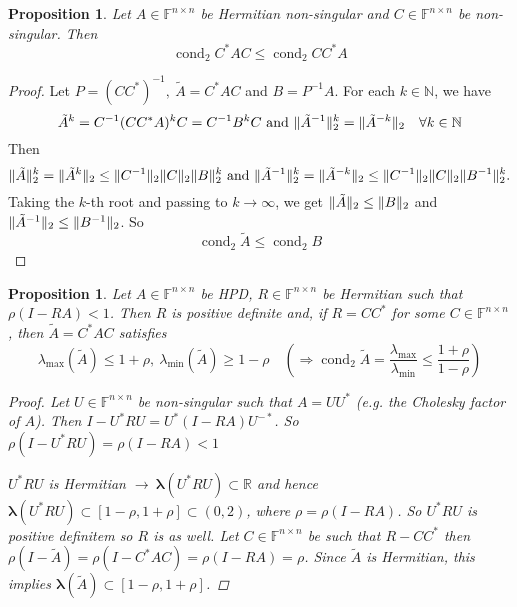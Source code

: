 \documentclass[12pt]{article}
\newcounter{lecture}
\newtheorem{proposition}[theorem]{Proposition}
\theoremstyle{definition}
\theoremstyle{remark}
\numberwithin{equation}{section}
\newcommand{\F}{\mathbb{F}}
\newcommand{\R}{\mathbb{R}}
\newcommand{\N}{\mathbb{N}}
\newcommand{\spectrum}[1]{\bm{\lambda}(#1)}
\DeclarePairedDelimiter{\norm}{\lVert}{\rVert}
\DeclareMathOperator{\cond}{cond}
\begin{document}
\begin{proposition}
  Let $A \in \F^{n\times n}$ be Hermitian non-singular and $C \in \F^{n\times n}$ be non-singular. Then
  \begin{equation*}
    \cond_2 C^* A C \leq \cond_2 C C^* A
  \end{equation*}
\end{proposition}
\begin{proof}
  Let $P = (CC^*)^{-1},\ \tilde{A} = C^* A C$ and $B = P^{-1} A$. For each $k \in \N$, we have
  \begin{equation*}
    \tilde{A}^k = C^{-1} (CC^*A)^k C = C^{-1} B^k C \text{ and } \norm{\tilde{A}^{-1}}^k_2 = \norm{\tilde{A}^{-k}}_2 \quad \forall k \in \N
  \end{equation*}
  Then
  \begin{equation*}
    \norm{\tilde{A}}_2^k = \norm{\tilde{A}^k}_2 \leq \norm{C^{-1}}_2\norm{C}_2 \norm{B}_2^k\text{ and }\norm{\tilde{A}^{-1}}_2^k = \norm{\tilde{A}^{-k}}_2 \leq \norm{C^{-1}}_2\norm{C}_2 \norm{B^{-1}}_2^k.
  \end{equation*}
  Taking the $k$-th root and passing to $k \rightarrow \infty$, we get $\norm{\tilde{A}}_2 \leq \norm{B}_2$ and $\norm{\tilde{A}^{-1}}_2 \leq \norm{B^{-1}}_2$. So
  \begin{equation*}
    \cond_2 \tilde{A} \leq \cond_2 B
  \end{equation*}
\end{proof}
\begin{proposition}
  \label{prop:9.2}
  Let $A \in \F^{n\times n}$ be HPD, $R \in \F^{n\times n}$ be Hermitian such that $\rho(I-RA) < 1$. Then $R$ is positive definite and, if $R = CC^*$ for some $C \in \F^{n\times n}$, then $\tilde{A} = C^* A C$ satisfies
  \begin{equation*}
    \lambda_{\max}(\tilde{A})\leq 1 + \rho,\ \lambda_{\min}(\tilde{A}) \geq 1 - \rho \quad (\Rightarrow \cond_2 \tilde{A} = \frac{\lambda_{\max}}{\lambda_{\min}} \leq \frac{1+\rho}{1-\rho})
  \end{equation*}
  \begin{proof}
    Let $U \in \F^{n\times n}$ be non-singular such that $A = UU^*$ (e.g. the Cholesky factor of $A$). Then $I - U^*RU = U^*(I-RA)U^{-*}$. So $\rho(I-U^*RU) = \rho(I-RA) < 1$

    $U^*RU$ is Hermitian $\rightarrow\ \spectrum{U^*RU} \subset \R$ and hence $\spectrum{U^*RU} \subset [1-\rho, 1+\rho] \subset (0,2)$, where $\rho = \rho(I-RA)$. So $U^*RU$ is positive definitem so $R$ is as well. Let $C \in \F^{n\times n}$ be such that $R - CC^*$ then $\rho(I-\tilde{A}) = \rho(I-C^*A C) = \rho(I - RA) =\rho$. Since $\tilde{A}$ is Hermitian, this implies $\spectrum{\tilde{A}} \subset [1-\rho, 1+\rho]$.
  \end{proof}
\end{proposition}
\end{document}
